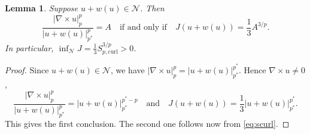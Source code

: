 \documentclass[12pt,leqno,twoside]{amsart}
\newtheorem{Lem}[Th]{Lemma}
\def\curl{\mathrm{curl}}
\newcommand{\cN}{{\mathcal N}}
\def\curlop{\nabla\times}
\numberwithin{equation}{section}
\begin{document}
\begin{Lem} \label{equiv}
Suppose $u+w(u)\in \cN$. Then 
\[
\frac{|\nabla\times u|_p^p}{|u+w(u)|_{p^*}^p} = A \quad \text{if and only if} \quad J(u+w(u)) = \frac13 A^{3/p}.
\]
In particular, $\inf_\cN J = \frac13S_{p,\curl}^{3/p}>0$.
\end{Lem}

\begin{proof}
Since $u+w(u)\in \cN$, we have $|\nabla\times u|_p^p = |u+w(u)|_{p^*}^{p^*}$. Hence $\curlop u\ne 0$,  
\[
\frac{|\nabla\times u|_p^p}{|u+w(u)|_{p^*}^p} =  |u+w(u)|_{p^*}^{p^*-p} \quad \text{and} \quad J(u+w(u)) = \frac13|u+w(u)|_{p^*}^{p^*}.
\] 
This gives the first conclusion. The second one follows now from \eqref{eq:scurl}.
\end{proof}

\medskip
\end{document}
